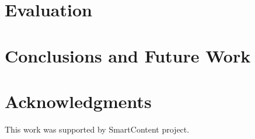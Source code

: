 \documentclass{llncs}
\begin{document}
\section{Evaluation}\label{sec:Evaluation}



\section{Conclusions and Future Work}\label{sec:Conclusions}





\section*{Acknowledgments}

This work was supported by SmartContent project.



%






\clearpage
{} %
\renewcommand{\indexname}{Author Index}
\printindex \clearpage
{} %
\renewcommand{\indexname}{Subject Index}
 
\end{document}
